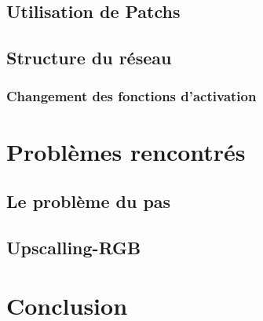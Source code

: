\documentclass[12pt, a4paper]{article}
\begin{document}
	\subsection{Utilisation de Patchs}
	\subsection{Structure du réseau}
	\subsubsection{Changement des fonctions d'activation}
\section{Problèmes rencontrés}
	\subsection{Le problème du pas}
	\subsection{Upscalling-RGB}

\section*{Conclusion}
\end{document}
